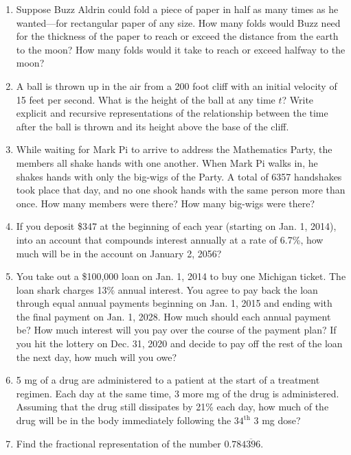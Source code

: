 \begin{problems}
\begin{enumerate}
\item Suppose Buzz Aldrin could fold a piece of paper in half as many times as he wanted---for rectangular paper of any size.  How many folds would Buzz need for the thickness of the paper to reach or exceed the distance from the earth to the moon?  How many folds would it take to reach or exceed halfway to the moon?

\item A ball is thrown up in the air from a 200 foot cliff with an initial velocity of 15 feet per second.  What is the height of the ball at any time $t$?  Write explicit and recursive representations of the relationship between the time after the ball is thrown and its height above the base of the cliff.

\item While waiting for Mark Pi to arrive to address the Mathematics Party, the members all shake hands with one another.  When Mark Pi walks in, he shakes hands with only the big-wigs of the Party.  A total of 6357 handshakes took place that day, and no one shook hands with the same person more than once.  How many members were there?  How many big-wigs were there?

\item If you deposit \$347 at the beginning of each year (starting on Jan. 1, 2014), into an account that compounds interest annually at a rate of 6.7\%, how much will be in the account on January 2, 2056?

\item You take out a \$100,000 loan on Jan. 1, 2014 to buy one Michigan ticket.  The loan shark charges 13\% annual interest.  You agree to pay back the loan through equal annual payments beginning on Jan. 1, 2015 and ending with the final payment on Jan. 1, 2028.  How much should each annual payment be? How much interest will you pay over the course of the payment plan?  If you hit the lottery on Dec. 31, 2020 and decide to pay off the rest of the loan the next day, how much will you owe?

\item 5 mg of a drug are administered to a patient at the start of a treatment regimen.  Each day at the same time, 3 more mg of the drug is administered.  Assuming that the drug still dissipates by 21\% each day, how much of the drug will be in the body immediately following the 3$4^\mathrm{th}$ 3 mg dose?

\item Find the fractional representation of the number $0.78\overline{4396}$.


\end{enumerate}
\end{problems}
